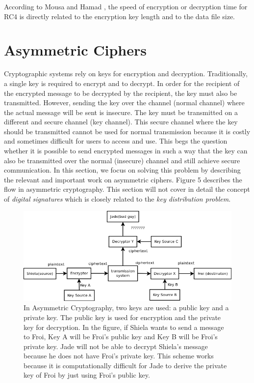 \documentclass{article}
\begin{document}
According to Mousa and Hamad \cite{mousa2006}, the speed of encryption or decryption time for RC4 is directly related to the encryption key length and to the data file size.

\section{Asymmetric Ciphers}

Cryptographic systems rely on keys for encryption and decryption.
Traditionally, a single key is required to encrypt and to decrypt.
In order for the recipient of the encrypted message to be decrypted
by the recipient, the key must also be transmitted. However, sending
the key over the channel (normal channel) where the actual message
will be sent is insecure. The key must be transmitted on a different
and secure channel (key channel)\cite{merkle_secure_1978}. This secure
channel where the key should be transmitted cannot be used for normal
transmission because it is costly and sometimes difficult for users
to access and use\cite{merkle_secure_1978}. This begs the question
whether it is possible to send encrypted messages in such a way that
the key can also be transmitted over the normal (insecure) channel
and still achieve secure communication. In this section, we focus
on solving this problem by describing the relevant and important work
on asymmetric ciphers. Figure 5 describes the flow in asymmetric cryptography.
This section will not cover in detail the concept of \textit{digital
signatures} which is closely related to the \textit{key distribution
problem}.

\begin{figure}[h]
\includegraphics[scale=0.6]{flowchart1}

\caption{In Asymmetric Cryptography, two keys are used: a public key and a
private key. The public key is used for encryption and the private
key for decryption. In the figure, if Shiela wants to send a message
to Froi, Key A will be Froi\textquoteright{}s public key and Key B
will be Froi\textquoteright{}s private key. Jade will not be able
to decrypt Shiela\textquoteright{}s message because he does not have
Froi\textquoteright{}s private key. This scheme works because it is
computationally difficult for Jade to derive the private key of Froi
by just using Froi\textquoteright{}s public key.}
\end{figure}
\end{document}
